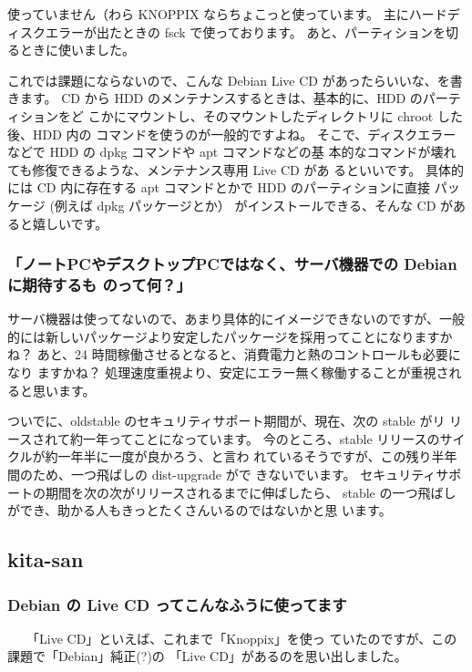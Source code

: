 \documentclass[mingoth,a4paper]{jsarticle}
\begin{document}
使っていません（わら
KNOPPIX ならちょこっと使っています。
主にハードディスクエラーが出たときの fsck で使っております。
あと、パーティションを切るときに使いました。

これでは課題にならないので、こんな Debian Live CD があったらいいな、を書
きます。
CD から HDD のメンテナンスするときは、基本的に、HDD のパーティションをど
こかにマウントし、そのマウントしたディレクトリに chroot した後、HDD 内の
コマンドを使うのが一般的ですよね。
そこで、ディスクエラーなどで HDD の dpkg コマンドや apt コマンドなどの基
本的なコマンドが壊れても修復できるような、メンテナンス専用 Live CD があ
るといいです。
具体的には CD 内に存在する apt コマンドとかで HDD のパーティションに直接
パッケージ (例えば dpkg パッケージとか） がインストールできる、そんな CD
があると嬉しいです。


\subsubsection{「ノートPCやデスクトップPCではなく、サーバ機器での Debian に期待するも
のって何？」}

サーバ機器は使ってないので、あまり具体的にイメージできないのですが、一般
的には新しいパッケージより安定したパッケージを採用ってことになりますかね？
あと、24 時間稼働させるとなると、消費電力と熱のコントロールも必要になり
ますかね？
処理速度重視より、安定にエラー無く稼働することが重視されると思います。

ついでに、oldstable のセキュリティサポート期間が、現在、次の stable がリ
リースされて約一年ってことになっています。
今のところ、stable リリースのサイクルが約一年半に一度が良かろう、と言わ
れているそうですが、この残り半年間のため、一つ飛ばしの dist-upgrade がで
きないでいます。
セキュリティサポートの期間を次の次がリリースされるまでに伸ばしたら、
stable の一つ飛ばしができ、助かる人もきっとたくさんいるのではないかと思
います。

\subsection{kita-san}

\subsubsection{Debian の Live CD ってこんなふうに使ってます}

　　「Live CD」といえば、これまで「Knoppix」を使っ
ていたのですが、この課題で「Debian」純正(?)の
「Live CD」があるのを思い出しました。
\end{document}

